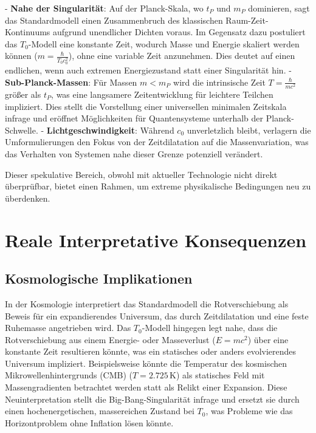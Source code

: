 \documentclass[a4paper,12pt]{article}
\begin{document}
	- \textbf{Nahe der Singularität}: Auf der Planck-Skala, wo \( t_P \) und \( m_P \) dominieren, sagt das Standardmodell einen Zusammenbruch des klassischen Raum-Zeit-Kontinuums aufgrund unendlicher Dichten voraus. Im Gegensatz dazu postuliert das \( T_0 \)-Modell eine konstante Zeit, wodurch Masse und Energie skaliert werden können (\( m = \frac{\hbar}{T_0 c_0^2} \)), ohne eine variable Zeit anzunehmen. Dies deutet auf einen endlichen, wenn auch extremen Energiezustand statt einer Singularität hin.
	- \textbf{Sub-Planck-Massen}: Für Massen \( m < m_P \) wird die intrinsische Zeit \( T = \frac{\hbar}{m c^2} \) größer als \( t_P \), was eine langsamere Zeitentwicklung für leichtere Teilchen impliziert. Dies stellt die Vorstellung einer universellen minimalen Zeitskala infrage und eröffnet Möglichkeiten für Quantensysteme unterhalb der Planck-Schwelle.
	- \textbf{Lichtgeschwindigkeit}: Während \( c_0 \) unverletzlich bleibt, verlagern die Umformulierungen den Fokus von der Zeitdilatation auf die Massenvariation, was das Verhalten von Systemen nahe dieser Grenze potenziell verändert.
	
	Dieser spekulative Bereich, obwohl mit aktueller Technologie nicht direkt überprüfbar, bietet einen Rahmen, um extreme physikalische Bedingungen neu zu überdenken.
	
	\section{Reale Interpretative Konsequenzen}
	
	\subsection{Kosmologische Implikationen}
	In der Kosmologie interpretiert das Standardmodell die Rotverschiebung als Beweis für ein expandierendes Universum, das durch Zeitdilatation und eine feste Ruhemasse angetrieben wird. Das \( T_0 \)-Modell hingegen legt nahe, dass die Rotverschiebung aus einem Energie- oder Masseverlust (\( E = m c^2 \)) über eine konstante Zeit resultieren könnte, was ein statisches oder anders evolvierendes Universum impliziert. Beispielsweise könnte die Temperatur des kosmischen Mikrowellenhintergrunds (CMB) (\( T = 2.725 \, \text{K} \)) als statisches Feld mit Massengradienten betrachtet werden statt als Relikt einer Expansion. Diese Neuinterpretation stellt die Big-Bang-Singularität infrage und ersetzt sie durch einen hochenergetischen, massereichen Zustand bei \( T_0 \), was Probleme wie das Horizontproblem ohne Inflation lösen könnte.
	
\end{document}
